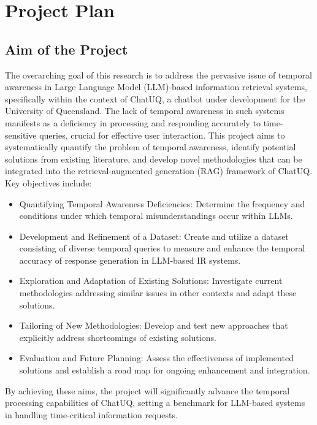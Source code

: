 \section{Project Plan}

\subsection{Aim of the Project}

The overarching goal of this research is to address the pervasive issue of temporal awareness in Large Language Model (LLM)-based information retrieval systems, specifically within the context of ChatUQ, a chatbot under development for the University of Queensland. The lack of temporal awareness in such systems manifests as a deficiency in processing and responding accurately to time-sensitive queries, crucial for effective user interaction. This project aims to systematically quantify the problem of temporal awareness, identify potential solutions from existing literature, and develop novel methodologies that can be integrated into the retrieval-augmented generation (RAG) framework of ChatUQ. Key objectives include: \\

\begin{itemize}
    \item Quantifying Temporal Awareness Deficiencies: Determine the frequency and conditions under which temporal misunderstandings occur within LLMs.
    \item Development and Refinement of a Dataset: Create and utilize a dataset consisting of diverse temporal queries to measure and enhance the temporal accuracy of response generation in LLM-based IR systems.
    \item Exploration and Adaptation of Existing Solutions: Investigate current methodologies addressing similar issues in other contexts and adapt these solutions.
    \item Tailoring of New Methodologies: Develop and test new approaches that explicitly address shortcomings of existing solutions.
    \item Evaluation and Future Planning: Assess the effectiveness of implemented solutions and establish a road map for ongoing enhancement and integration.
\end{itemize}

By achieving these aims, the project will significantly advance the temporal processing capabilities of ChatUQ, setting a benchmark for LLM-based systems in handling time-critical information requests.


